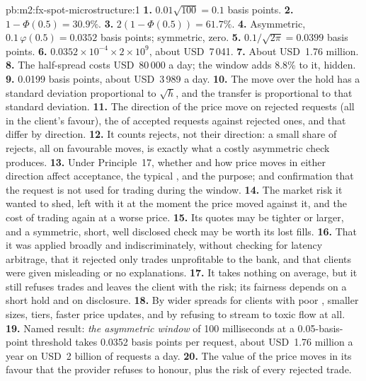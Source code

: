 \begin{solution}{pb:m2:fx-spot-microstructure:1}
\textbf{1.} $0.01\sqrt{100} = 0.1$ basis points.
\textbf{2.} $1 - \Phi(0.5) = 30.9\%$.
\textbf{3.} $2(1 - \Phi(0.5)) = 61.7\%$.
\textbf{4.} Asymmetric, $0.1\,\varphi(0.5) = 0.0352$ basis points; symmetric,
zero.
\textbf{5.} $0.1/\sqrt{2\pi} = 0.0399$ basis points.
\textbf{6.} $0.0352 \times 10^{-4} \times 2 \times 10^9$, about USD~7\,041.
\textbf{7.} About USD~1.76 million.
\textbf{8.} The half-spread costs USD~80\,000 a day; the window adds 8.8\% to
it, hidden.
\textbf{9.} 0.0199 basis points, about USD~3\,989 a day.
\textbf{10.} The move over the hold has a standard deviation proportional to
$\sqrt h$, and the transfer is proportional to that standard deviation.
\textbf{11.} The direction of the price move on rejected requests (all in the
client's favour), the  of accepted requests against rejected ones, and
 that differ by direction.
\textbf{12.} It counts rejects, not their direction: a small share of rejects,
all on favourable moves, is exactly what a costly asymmetric check produces.
\textbf{13.} Under Principle~17, whether and how price moves in either
direction affect acceptance, the typical , and the purpose; and
confirmation that the request is not used for trading during the window.
\textbf{14.} The market risk it wanted to shed, left with it at the moment the
price moved against it, and the cost of trading again at a worse price.
\textbf{15.} Its quotes may be tighter or larger, and a symmetric, short, well
disclosed check may be worth its lost fills.
\textbf{16.} That it was applied broadly and indiscriminately, without checking
for latency arbitrage, that it rejected only trades unprofitable to the bank,
and that clients were given misleading or no explanations.
\textbf{17.} It takes nothing on average, but it still refuses trades and leaves
the client with the risk; its fairness depends on a short hold and on
disclosure.
\textbf{18.} By wider spreads for clients with poor , smaller sizes,
tiers, faster price updates, and by refusing to stream to toxic flow at all.
\textbf{19.} Named result: \emph{the asymmetric window} of 100 milliseconds at
a 0.05-basis-point threshold takes 0.0352 basis points per request, about
USD~1.76 million a year on USD~2 billion of requests a day.
\textbf{20.} The value of the price moves in its favour that the provider refuses
to honour, plus the risk of every rejected trade.
\end{solution}


